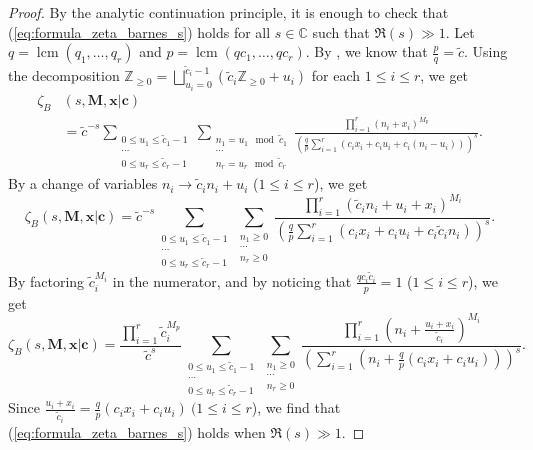 \documentclass[a4paper]{amsart}
\theoremstyle{remark}
\theoremstyle{definition}
\DeclareMathOperator{\ppcm}{lcm}
\begin{document}
\begin{proof}
By the analytic continuation principle, it is enough to check that (\ref{eq:formula_zeta_barnes_s}) holds for all $s \in \mathbb{C}$ such that $\Re(s) \gg 1$. Let $q = \ppcm(q_1, \ldots, q_r)$ and $p = \ppcm(q c_1,\ldots,q c_r)$. By \cite[p.3]{sakane2022values}, we know that $\frac{p}{q}=\tilde{c}$. Using the decomposition $\mathbb{Z}_{\geq 0} = \bigsqcup_{u_i=0}^{\tilde{c}_i-1} \left( \tilde{c}_i \mathbb{Z}_{\geq 0}+u_i \right)$ for each $1 \leq i \leq r$, we get
\begin{align*}
    \zeta_B&(s,\mathbf{M},\mathbf{x}|\mathbf{c}) \\
    & =\tilde{c}^{-s} \sum_{\substack{0 \leq u_1 \leq \tilde{c}_1-1 \\ \cdots \\ 0 \leq u_r \leq \tilde{c}_r-1}} \sum_{\substack{n_1 = u_1 \mod \tilde{c}_1 \\ \cdots \\ n_r = u_r \mod \tilde{c}_r}}  \frac{\prod_{i=1}^r (n_i+x_i)^{M_p}}{\left( \frac{q}{p} \sum_{i=1}^r (c_i x_i + c_i u_i + c_i(n_i-u_i)) \right)^s}.
\end{align*}
By a change of variables $n_i \to \tilde{c}_i n_i+u_i$ ($1 \leq i \leq r$), we get
$$ \zeta_B(s,\mathbf{M},\mathbf{x}|\mathbf{c})= \tilde{c}^{-s} \sum_{\substack{0 \leq u_1 \leq \tilde{c}_1-1 \\ \cdots \\ 0 \leq u_r \leq \tilde{c}_r-1}} \sum_{\substack{n_1 \geq 0 \\ \cdots \\ n_r \geq 0}} \frac{\prod_{i=1}^r (\tilde{c}_i n_i+u_i+x_i)^{M_i}}{\left( \frac{q}{p} \sum_{i=1}^r (c_i x_i + c_i u_i + c_i \tilde{c}_i n_i) \right)^s}. $$
By factoring $\tilde{c}_i^{M_i}$ in the numerator, and by noticing that $\frac{q c_i \tilde{c}_i}{p}=1$ ($1 \leq i \leq r$), we get
$$ \zeta_B(s,\mathbf{M},\mathbf{x}|\mathbf{c})= \frac{\prod_{i=1}^{r} \tilde{c}_i^{M_p}}{\tilde{c}^{s}} \sum_{\substack{0 \leq u_1 \leq \tilde{c}_1-1 \\ \cdots \\ 0 \leq u_r \leq \tilde{c}_r-1}} \sum_{\substack{n_1 \geq 0 \\ \cdots \\ n_r \geq 0}} \frac{\prod_{i=1}^r \left(n_i +  \frac{u_i +x_i}{\tilde{c}_i} \right)^{M_i}}{\left( \sum_{i=1}^r \left( n_i + \frac{q}{p} (c_i x_i + c_i u_i) \right) \right) ^s}. $$
Since $\frac{u_i+x_i}{\tilde{c}_i} = \frac{q}{p} (c_i x_i + c_i u_i) \ (1 \leq i \leq r$), we find that (\ref{eq:formula_zeta_barnes_s}) holds when $\Re(s) \gg 1$.
\end{proof}
\end{document}
